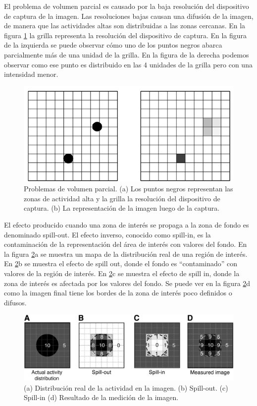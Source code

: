 El problema de volumen parcial es causado por la baja resolución del dispositivo de captura de la imagen. Las resoluciones bajas causan una difusión de la imagen, de manera que las actividades altas son distribuidas a las zonas cercanas. En la figura \ref{fig:resolucion} la grilla representa la resolución del dispositivo de captura. En la figura de la izquierda se puede observar cómo uno de los puntos negros abarca parcialmente más de una unidad de la grilla. En la figura de la derecha podemos observar como ese punto es distribuido en las 4 unidades de la grilla pero con una intensidad menor.

\begin{figure}[H]
\centering
\includegraphics[scale=0.3]{images/resolution.png}
\caption{Problemas de volumen parcial. (a) Los puntos negros representan las zonas de actividad alta y la grilla la resolución del dispositivo de captura. (b) La representación de la imagen luego de la captura.}
\label{fig:resolucion}
\end{figure}

El efecto producido cuando una zona de interés se propaga a la zona de fondo es denominado spill-out. El efecto inverso, conocido como spill-in, es la contaminación de la representación del área de interés con valores del fondo. En la figura \ref{fig:spill}a se muestra un mapa de la distribución real de una región de interés. En \ref{fig:spill}b se muestra el efecto de spill out, donde el fondo es “contaminado” con valores de la región de interés. En \ref{fig:spill}c se muestra el efecto de spill in, donde la zona de interés es afectada por los valores del fondo. Se puede ver en la figura \ref{fig:spill}d como la imagen final tiene los bordes de la zona de interés poco definidos o difusos.

\begin{figure}[H]
\centering
\includegraphics[scale=0.2]{images/spill.jpg}
\caption{(a) Distribución real de la actividad en la imagen. (b) Spill-out. (c) Spill-in (d) Resultado de la medición de la imagen.}
\label{fig:spill}
\end{figure}

